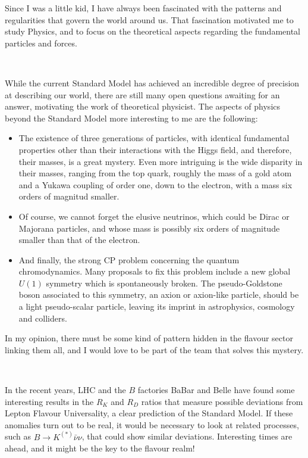 \documentclass[combined.tex]{subfiles}
\begin{document}
Since I was a little kid, I have always been fascinated with the patterns and regularities that govern the world around us. That fascination motivated me to study Physics, and to focus on the theoretical aspects regarding the fundamental particles and forces.

{}~

While the current Standard Model has achieved an incredible degree of precision at describing our world, there are still many open questions awaiting for an answer, motivating the work of theoretical physicist. The aspects of physics beyond the Standard Model more interesting to me are the following:
\begin{itemize}
\item The existence of three generations of particles, with identical fundamental properties other than their interactions with the Higgs field, and therefore, their masses, is a great mystery. Even more intriguing is the wide disparity in their masses, ranging from the top quark, roughly the mass of a gold atom and a Yukawa coupling of order one, down to the electron, with a mass six orders of magnitud smaller.
\item Of course, we cannot forget the elusive neutrinos, which could be Dirac or Majorana particles, and whose mass is possibly six orders of magnitude smaller than that of the electron.
\item And finally, the strong CP problem concerning the quantum chromodynamics. Many proposals to fix this problem include a new global $U(1)$ symmetry which is spontaneously broken. The pseudo-Goldstone boson associated to this symmetry, an axion or axion-like particle, should be a light pseudo-scalar particle, leaving its imprint in astrophysics, cosmology and colliders.
\end{itemize}
  In my opinion, there must be some kind of pattern hidden in the flavour sector linking them all, and I would love to be part of the team that solves this mystery.

{}~


In the recent years, LHC and the $B$ factories BaBar and Belle have found some interesting results in the $R_K$ and $R_D$ ratios that measure possible deviations from Lepton Flavour Universality, a clear prediction of the Standard Model. If these anomalies turn out to be real, it would be necessary to look at related processes, such as $B\to K^{(*)} \bar{\nu}\nu$, that could show similar deviations. Interesting times are ahead, and it might be the key to the flavour realm!
\end{document}
